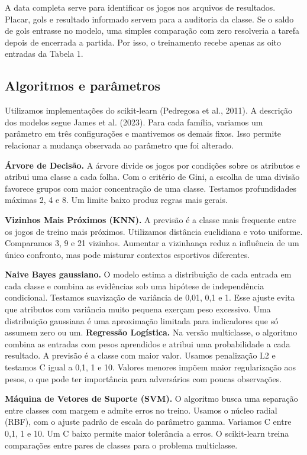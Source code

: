 \documentclass[12pt]{article}
\begin{document}
A data completa serve para identificar os jogos nos arquivos de resultados. Placar, gols e resultado informado servem para a auditoria da classe. Se o saldo de gols entrasse no modelo, uma simples comparação com zero resolveria a tarefa depois de encerrada a partida. Por isso, o treinamento recebe apenas as oito entradas da Tabela 1.
\subsection{Algoritmos e parâmetros}
Utilizamos implementações do scikit-learn (Pedregosa et al., 2011). A descrição dos modelos segue James et al. (2023). Para cada família, variamos um parâmetro em três configurações e mantivemos os demais fixos. Isso permite relacionar a mudança observada ao parâmetro que foi alterado.

\textbf{Árvore de Decisão.} A árvore divide os jogos por condições sobre os atributos e atribui uma classe a cada folha. Com o critério de Gini, a escolha de uma divisão favorece grupos com maior concentração de uma classe. Testamos profundidades máximas 2, 4 e 8. Um limite baixo produz regras mais gerais.

\textbf{Vizinhos Mais Próximos (KNN).} A previsão é a classe mais frequente entre os jogos de treino mais próximos. Utilizamos distância euclidiana e voto uniforme. Comparamos 3, 9 e 21 vizinhos. Aumentar a vizinhança reduz a influência de um único confronto, mas pode misturar contextos esportivos diferentes.

\textbf{Naive Bayes gaussiano.} O modelo estima a distribuição de cada entrada em cada classe e combina as evidências sob uma hipótese de independência condicional. Testamos suavização de variância de 0,01, 0,1 e 1. Esse ajuste evita que atributos com variância muito pequena exerçam peso excessivo. Uma distribuição gaussiana é uma aproximação limitada para indicadores que só assumem zero ou um.
\clearpage
\textbf{Regressão Logística.} Na versão multiclasse, o algoritmo combina as entradas com pesos aprendidos e atribui uma probabilidade a cada resultado. A previsão é a classe com maior valor. Usamos penalização L2 e testamos C igual a 0,1, 1 e 10. Valores menores impõem maior regularização aos pesos, o que pode ter importância para adversários com poucas observações.

\textbf{Máquina de Vetores de Suporte (SVM).} O algoritmo busca uma separação entre classes com margem e admite erros no treino. Usamos o núcleo radial (RBF), com o ajuste padrão de escala do parâmetro gamma. Variamos C entre 0,1, 1 e 10. Um C baixo permite maior tolerância a erros. O scikit-learn treina comparações entre pares de classes para o problema multiclasse.
\end{document}
